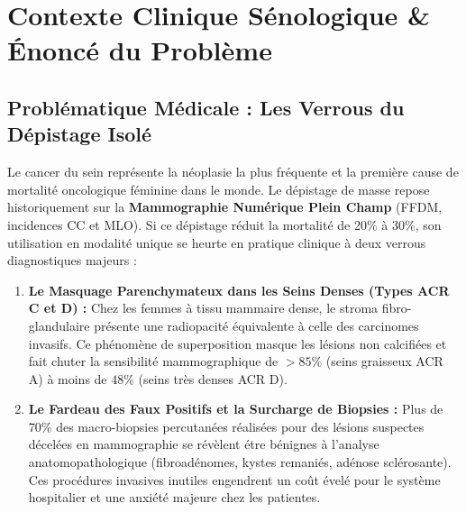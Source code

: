 \documentclass[11pt,a4paper]{article}
\begin{document}
\section{Contexte Clinique Sénologique \& Énoncé du Problème}
\label{sec:clinical_context}

\subsection{Problématique Médicale : Les Verrous du Dépistage Isolé}
Le cancer du sein représente la néoplasie la plus fréquente et la première cause de mortalit\'e oncologique f\'eminine dans le monde. Le d\'epistage de masse repose historiquement sur la \textbf{Mammographie Numérique Plein Champ} (FFDM, incidences CC et MLO). Si ce d\'epistage r\'eduit la mortalit\'e de 20\% \`a 30\%, son utilisation en modalit\'e unique se heurte en pratique clinique \`a deux verrous diagnostiques majeurs :

\begin{enumerate}
    \item \textbf{Le Masquage Parenchymateux dans les Seins Denses (Types ACR C et D) :} Chez les femmes \`a tissu mammaire dense, le stroma fibro-glandulaire pr\'esente une radiopacit\'e \'equivalente \`a celle des carcinomes invasifs. Ce ph\'enom\`ene de superposition masque les l\'esions non calcifi\'ees et fait chuter la sensibilit\'e mammographique de $>85\%$ (seins graisseux ACR A) \`a moins de $48\%$ (seins tr\`es denses ACR D).
    \item \textbf{Le Fardeau des Faux Positifs et la Surcharge de Biopsies :} Plus de $70\%$ des macro-biopsies percutan\'ees r\'ealis\'ees pour des l\'esions suspectes d\'ecel\'ees en mammographie se r\'ev\`elent \'etre b\'enignes \`a l'analyse anatomopathologique (fibroad\'enomes, kystes remani\'es, ad\'enose scl\'erosante). Ces proc\'edures invasives inutiles engendrent un co\^ut \'evel\'e pour le syst\`eme hospitalier et une anxi\'et\'e majeure chez les patientes.
\end{enumerate}
\end{document}
